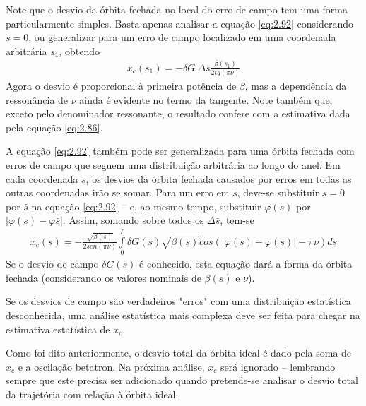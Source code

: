Note que o desvio da órbita fechada no local do erro de campo tem uma forma particularmente simples. Basta apenas analisar a equação \eqref{eq:2.92} considerando $s=0$, ou generalizar para um erro de campo localizado em uma coordenada arbitrária $s_1$, obtendo
\begin{align}
	x_c(s_1) = -\delta G\ \Delta s \frac{\beta(s_1)}{2 tg(\pi\nu)}
\end{align}
Agora o desvio é proporcional à primeira potência de $\beta$, mas a dependência da ressonância de $\nu$ ainda é evidente no termo da tangente. Note também que, exceto pelo denominador ressonante, o resultado confere com a estimativa dada pela equação \eqref{eq:2.86}.

A equação \eqref{eq:2.92} também pode ser generalizada para uma órbita fechada com erros de campo que seguem uma distribuição arbitrária ao longo do anel. Em cada coordenada $s$, os desvios da órbita fechada causados por erros em todas as outras coordenadas irão se somar. Para um erro em $\bar{s}$, deve-se substituir $s=0$ por $\bar{s}$ na equação \eqref{eq:2.92} -- e, ao mesmo tempo, substituir $\varphi(s)$ por $|\varphi(s) - \varphi\bar{s}|$. Assim, somando sobre todos os $\Delta \bar{s}$, tem-se 
\begin{align}
	x_c(s) = -\frac{\sqrt{\beta(s)}}{2sen(\pi\nu)}\int\limits_{0}^{L}\delta G(\bar{s})\sqrt{\beta(\bar{s})}cos(|\varphi(s)-\varphi(\bar{s})|-\pi\nu)d\bar{s}
\end{align}
Se o desvio de campo $\delta G(s)$ é conhecido, esta equação dará a forma da órbita fechada (considerando os valores nominais de $\beta(s)$ e $\nu$).

Se os desvios de campo são verdadeiros "erros" com uma distribuição estatística desconhecida, uma análise estatística mais complexa deve ser feita para chegar na estimativa estatística de $x_c$.

Como foi dito anteriormente, o desvio total da órbita ideal é dado pela soma de $x_c$ e a oscilação betatron. Na próxima análise, $x_c$ será ignorado -- lembrando sempre que este precisa ser adicionado quando pretende-se analisar o desvio total da trajetória com relação à órbita ideal.